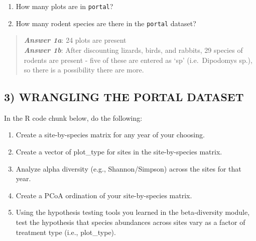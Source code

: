 \documentclass[]{article}
\providecommand{\tightlist}{%
  \setlength{\itemsep}{0pt}\setlength{\parskip}{0pt}}
\begin{document}
\begin{enumerate}
\def\labelenumi{\alph{enumi}.}
\tightlist
\item
  How many plots are in \texttt{portal}?
\item
  How many rodent species are there in the \texttt{portal} dataset?
\end{enumerate}

\begin{quote}
\textbf{\emph{Answer 1a}}: 24 plots are present\\
\textbf{\emph{Answer 1b}}: After discounting lizards, birds, and
rabbits, 29 species of rodents are present - five of these are entered
as `sp' (i.e.~Dipodomys sp.), so there is a possibility there are more.
\end{quote}

\subsection{3) WRANGLING THE PORTAL
DATASET}\label{wrangling-the-portal-dataset}

In the R code chunk below, do the following:

\begin{enumerate}
\def\labelenumi{\arabic{enumi}.}
\tightlist
\item
  Create a site-by-species matrix for any year of your choosing.
\item
  Create a vector of plot\_type for sites in the site-by-species matrix.
\item
  Analyze alpha diversity (e.g., Shannon/Simpson) across the sites for
  that year.
\item
  Create a PCoA ordination of your site-by-species matrix.
\item
  Using the hypothesis testing tools you learned in the beta-diversity
  module, test the hypothesis that species abundances across sites vary
  as a factor of treatment type (i.e., plot\_type).
\end{enumerate}
\end{document}
